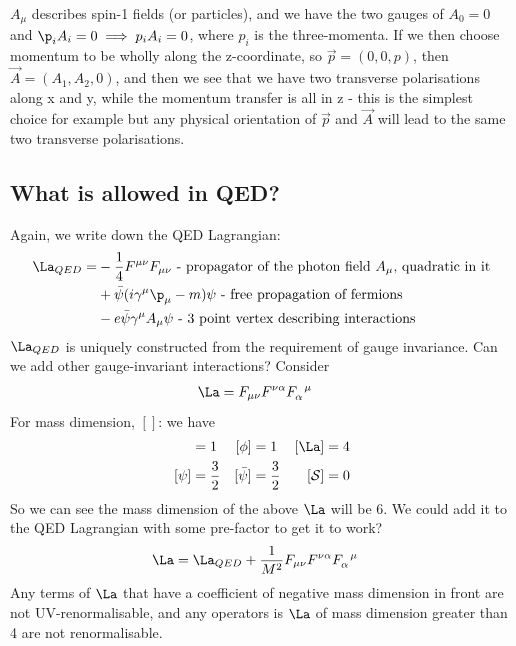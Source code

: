 \documentclass[relqm.tex]{subfiles}
\begin{document}
$A_\mu$ describes spin-1 fields (or particles), and we have the two gauges of $A_0 = 0$ and $\p_i A_i = 0 \implies p_i A_i = 0$, where $p_i$ is the three-momenta.
If we then choose momentum to be wholly along the z-coordinate, so $\vec{p}=(0,0,p)$, then $\vec{A} = (A_1,A_2,0)$, and then we see that we have two transverse polarisations along x and y, while the momentum transfer is all in z - this is the simplest choice for example but any physical orientation of $\vec{p}$ and $\vec{A}$ will lead to the same two transverse polarisations.

\subsection{What is allowed in QED?}
Again, we write down the QED Lagrangian:
\begin{align}
    \La_{QED} = &-\frac14 F^{\mu\nu}F_{\mu\nu} \text{ - propagator of the photon field $A_\mu$, quadratic in it} \nonumber \\
                &+ \bar{\psi}(i\gamma^\mu\p_\mu -m)\psi \text{ - free propagation of fermions} \nonumber \\
                &- e\bar{\psi}\gamma^\mu A_\mu\psi \text{ - 3 point vertex describing interactions}
\end{align}
$\La_{QED}$ is uniquely constructed from the requirement of gauge invariance. 
Can we add other gauge-invariant interactions?
Consider
\begin{align}
    \La &= F_{\mu\nu}F^{\nu\alpha}\tensor{F}{_\alpha^\mu}
\end{align}
For mass dimension, $[]$: we have
\begin{align}
    [A_\mu] &= 1 & [\phi] & = 1 & [\La] &= 4 \\
    [\psi] &= \frac32 & [\bar{\psi}] &= \frac32 & [\mathcal{S}] &= 0 
\end{align}
So we can see the mass dimension of the above $\La$ will be 6. 
We could add it to the QED Lagrangian with some pre-factor to get it to work?
\begin{align}
    \La &= \La_{QED} + \frac{1}{M^2}F_{\mu\nu}F^{\nu\alpha}\tensor{F}{_\alpha^\mu}
\end{align}
Any terms of $\La$ that have a coefficient of negative mass dimension in front are not UV-renormalisable, and any operators is $\La$ of mass dimension greater than 4 are not renormalisable. 
\end{document}
